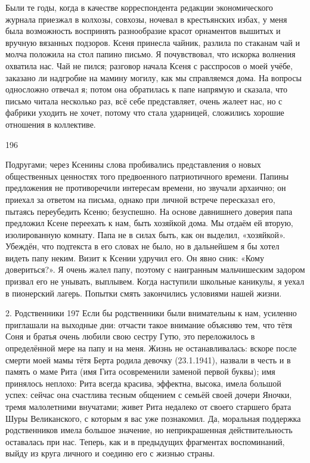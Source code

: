 Были те годы, когда в качестве корреспондента редакции экономического журнала приезжал в колхозы, совхозы, ночевал в крестьянских избах, у меня была возможность воспринять разнообразие красот орнаментов вышитых и вручную вязанных подзоров. Ксеня принесла чайник, разлила по стаканам чай и молча положила на стол папино письмо. Я почувствовал, что искорка волнения охватила нас. Чай не пился; разговор начала Ксеня с расспросов о моей учёбе, заказано ли надгробие на мамину могилу, как мы справляемся дома. На вопросы односложно отвечал я; потом она обратилась к папе напрямую и сказала, что письмо читала несколько раз, всё себе представляет, очень жалеет нас, но с фабрики уходить не хочет, потому что стала ударницей, сложились хорошие отношения в коллективе.

196

Подругами; через Ксенины слова пробивались представления о новых общественных ценностях того предвоенного патриотичного времени. Папины предложения не противоречили интересам времени, но звучали архаично; он приехал за ответом на письма, однако при личной встрече пересказал его, пытаясь переубедить Ксеню; безуспешно. На основе давнишнего доверия папа предложил Ксене переехать к нам, быть хозяйкой дома. Мы отдаём ей вторую, изолированную комнату. Папа не в силах быть, как он выделил, «хозяйкой». Убеждён, что подтекста в его словах не было, но в дальнейшем я бы хотел видеть папу неким. Визит к Ксении удручил его. Он явно сник: «Кому довериться?». Я очень жалел папу, поэтому с наигранным мальчишеским задором призвал его не унывать, выплывем. Когда наступили школьные каникулы, я уехал в пионерский лагерь. Попытки смять закончились условиями нашей жизни.

2. Родственники
197 Если бы родственники были внимательны к нам, усиленно приглашали на выходные дни: отчасти такое внимание объясняю тем, что тётя Соня и братья очень любили свою сестру Гутю, это переложилось в определённой мере на папу и на меня. Жизнь не останавливалась: вскоре после смерти моей мамы тётя Берта родила девочку (23.1.1941), назвали в честь и в память о маме Рита (имя Гита осовременили заменой первой буквы); имя принялось неплохо: Рита всегда красива, эффектна, высока, имела большой успех: сейчас она счастлива тесным общением с семьёй своей дочери Яночки, тремя малолетними внучатами; живет Рита недалеко от своего старшего брата Шуры Великанского, с которым я вас уже познакомил. Да, моральная поддержка родственников имела большое значение, но неприкрашенная действительность оставалась при нас.
Теперь, как и в предыдущих фрагментах воспоминаний, выйду из круга личного и соединю его с жизнью страны.